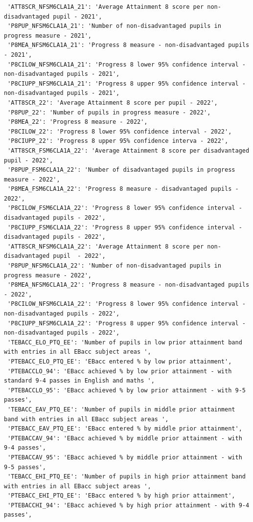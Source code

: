 \documentclass[
  letterpaper,
  DIV=11,
  numbers=noendperiod]{scrartcl}
\begin{document}
\begin{verbatim}
 'ATT8SCR_NFSM6CLA1A_21': 'Average Attainment 8 score per non-disadvantaged pupil - 2021',
 'P8PUP_NFSM6CLA1A_21': 'Number of non-disadvantaged pupils in progress measure - 2021',
 'P8MEA_NFSM6CLA1A_21': 'Progress 8 measure - non-disadvantaged pupils - 2021',
 'P8CILOW_NFSM6CLA1A_21': 'Progress 8 lower 95% confidence interval - non-disadvantaged pupils - 2021',
 'P8CIUPP_NFSM6CLA1A_21': 'Progress 8 upper 95% confidence interval - non-disadvantaged pupils - 2021',
 'ATT8SCR_22': 'Average Attainment 8 score per pupil - 2022',
 'P8PUP_22': 'Number of pupils in progress measure - 2022',
 'P8MEA_22': 'Progress 8 measure - 2022',
 'P8CILOW_22': 'Progress 8 lower 95% confidence interval - 2022',
 'P8CIUPP_22': 'Progress 8 upper 95% confidence interva - 2022',
 'ATT8SCR_FSM6CLA1A_22': 'Average Attainment 8 score per disadvantaged pupil - 2022',
 'P8PUP_FSM6CLA1A_22': 'Number of disadvantaged pupils in progress measure - 2022',
 'P8MEA_FSM6CLA1A_22': 'Progress 8 measure - disadvantaged pupils - 2022',
 'P8CILOW_FSM6CLA1A_22': 'Progress 8 lower 95% confidence interval - disadvantaged pupils - 2022',
 'P8CIUPP_FSM6CLA1A_22': 'Progress 8 upper 95% confidence interval - disadvantaged pupils - 2022',
 'ATT8SCR_NFSM6CLA1A_22': 'Average Attainment 8 score per non-disadvantaged pupil  - 2022',
 'P8PUP_NFSM6CLA1A_22': 'Number of non-disadvantaged pupils in progress measure - 2022',
 'P8MEA_NFSM6CLA1A_22': 'Progress 8 measure - non-disadvantaged pupils - 2022',
 'P8CILOW_NFSM6CLA1A_22': 'Progress 8 lower 95% confidence interval - non-disadvantaged pupils - 2022',
 'P8CIUPP_NFSM6CLA1A_22': 'Progress 8 upper 95% confidence interval - non-disadvantaged pupils - 2022',
 'TEBACC_ELO_PTQ_EE': 'Number of pupils in low prior attainment band with entries in all EBacc subject areas ',
 'PTEBACC_ELO_PTQ_EE': 'EBacc entered % by low prior attainment',
 'PTEBACCLO_94': 'EBacc achieved % by low prior attainment - with standard 9-4 passes in English and maths ',
 'PTEBACCLO_95': 'EBacc achieved % by low prior attainment - with 9-5 passes',
 'TEBACC_EAV_PTQ_EE': 'Number of pupils in middle prior attainment band with entries in all EBacc subject areas ',
 'PTEBACC_EAV_PTQ_EE': 'EBacc entered % by middle prior attainment',
 'PTEBACCAV_94': 'EBacc achieved % by middle prior attainment - with 9-4 passes',
 'PTEBACCAV_95': 'EBacc achieved % by middle prior attainment - with 9-5 passes',
 'TEBACC_EHI_PTQ_EE': 'Number of pupils in high prior attainment band with entries in all EBacc subject areas ',
 'PTEBACC_EHI_PTQ_EE': 'EBacc entered % by high prior attainment',
 'PTEBACCHI_94': 'EBacc achieved % by high prior attainment - with 9-4 passes',

\end{verbatim}
\end{document}
